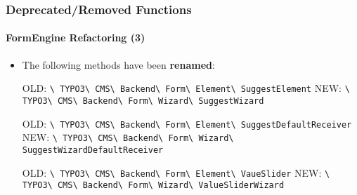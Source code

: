 \begin{frame}[fragile]
	\frametitle{Deprecated/Removed Functions}
	\framesubtitle{FormEngine Refactoring (3)}

	\begin{itemize}

		\item The following methods have been \textbf{renamed}:\newline

			\smaller
				OLD:\tabto{0.8cm}
					\texttt{\textbackslash
						TYPO3\textbackslash
						CMS\textbackslash
						Backend\textbackslash
						Form\textbackslash
						Element\textbackslash
						SuggestElement}\newline
				NEW:\tabto{0.8cm}
					\texttt{\textbackslash
						TYPO3\textbackslash
						CMS\textbackslash
						Backend\textbackslash
						Form\textbackslash
						Wizard\textbackslash
						SuggestWizard}\newline

				OLD:\tabto{0.8cm}
					\texttt{\textbackslash
						TYPO3\textbackslash
						CMS\textbackslash
						Backend\textbackslash
						Form\textbackslash
						Element\textbackslash
						SuggestDefaultReceiver}\newline
				NEW:\tabto{0.8cm}
					\texttt{\textbackslash
						TYPO3\textbackslash
						CMS\textbackslash
						Backend\textbackslash
						Form\textbackslash
						Wizard\textbackslash
						SuggestWizardDefaultReceiver}\newline

				OLD:\tabto{0.8cm}
					\texttt{\textbackslash
						TYPO3\textbackslash
						CMS\textbackslash
						Backend\textbackslash
						Form\textbackslash
						Element\textbackslash
						VaueSlider}\newline
				NEW:\tabto{0.8cm}
					\texttt{\textbackslash
						TYPO3\textbackslash
						CMS\textbackslash
						Backend\textbackslash
						Form\textbackslash
						Wizard\textbackslash
						ValueSliderWizard}\newline

			\normalsize

	\end{itemize}

\end{frame}


